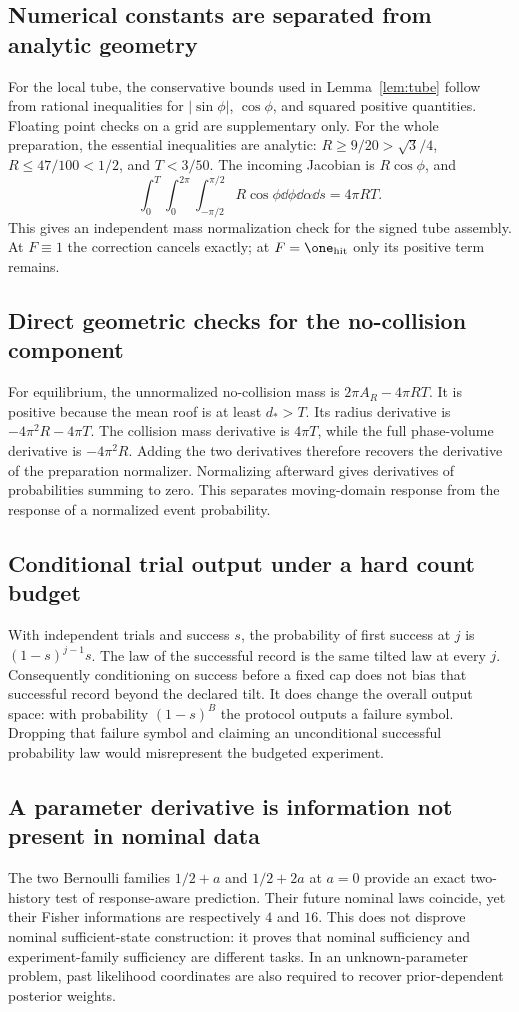\subsection{Numerical constants are separated from analytic geometry}
For the local tube, the conservative bounds used in Lemma~\ref{lem:tube} follow from rational inequalities for $|\sin\phi|$, $\cos\phi$, and squared positive quantities. Floating point checks on a grid are supplementary only. For the whole preparation, the essential inequalities are analytic:
$R\ge9/20>\sqrt3/4$, $R\le47/100<1/2$, and $T<3/50$.
The incoming Jacobian is $R\cos\phi$, and
\[
 \int_0^T\int_0^{2\pi}\int_{-\pi/2}^{\pi/2}R\cos\phi\dd\phi\dd\alpha\dd s=4\pi RT.
\]
This gives an independent mass normalization check for the signed tube assembly. At $F\equiv1$ the correction cancels exactly; at $F=\one_{\rm hit}$ only its positive term remains.

\subsection{Direct geometric checks for the no-collision component}
For equilibrium, the unnormalized no-collision mass is
$2\pi A_R-4\pi RT$. It is positive because the mean roof is at least $d_*>T$. Its radius derivative is $-4\pi^2R-4\pi T$. The collision mass derivative is $4\pi T$, while the full phase-volume derivative is $-4\pi^2R$. Adding the two derivatives therefore recovers the derivative of the preparation normalizer. Normalizing afterward gives derivatives of probabilities summing to zero. This separates moving-domain response from the response of a normalized event probability.

\subsection{Conditional trial output under a hard count budget}
With independent trials and success $s$, the probability of first success at $j$ is $(1-s)^{j-1}s$. The law of the successful record is the same tilted law at every $j$. Consequently conditioning on success before a fixed cap does not bias that successful record beyond the declared tilt. It does change the overall output space: with probability $(1-s)^B$ the protocol outputs a failure symbol. Dropping that failure symbol and claiming an unconditional successful probability law would misrepresent the budgeted experiment.

\subsection{A parameter derivative is information not present in nominal data}
The two Bernoulli families $1/2+a$ and $1/2+2a$ at $a=0$ provide an exact two-history test of response-aware prediction. Their future nominal laws coincide, yet their Fisher informations are respectively $4$ and $16$. This does not disprove nominal sufficient-state construction: it proves that nominal sufficiency and experiment-family sufficiency are different tasks. In an unknown-parameter problem, past likelihood coordinates are also required to recover prior-dependent posterior weights.

